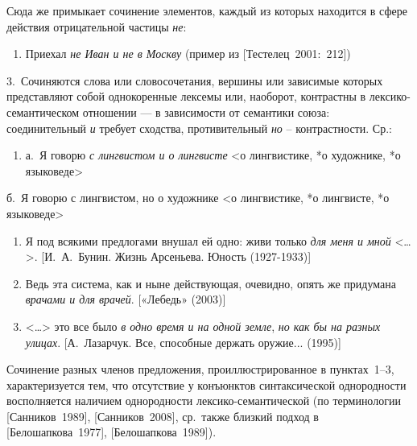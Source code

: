 Сюда же примыкает сочинение элементов, каждый из которых находится в
сфере действия отрицательной частицы \textit{не}:

\begin{enumerate}
  \def\labelenumi{(\arabic{enumi})}
  \setcounter{enumi}{37}
  \item
        Приехал \textit{не Иван и не в Москву} (пример из
        {[}Тестелец~2001:~212{]})
\end{enumerate}

3.~Сочиняются слова или словосочетания, вершины или зависимые которых
представляют собой однокоренные лексемы или, наоборот, контрастны в
лексико-семантическом отношении --- в зависимости от семантики союза:
соединительный \textit{и} требует сходства, противительный \textit{но} --
контрастности. Ср.:

\begin{enumerate}
  \def\labelenumi{(\arabic{enumi})}
  \setcounter{enumi}{38}
  \item
        а.~Я говорю \textit{с лингвистом и о лингвисте} \textless о лингвистике,
        *о художнике, *о языковеде\textgreater{}
\end{enumerate}

б.~Я говорю с лингвистом, но о художнике \textless*о лингвистике, *о
лингвисте, *о языковеде\textgreater{}

\begin{enumerate}
  \def\labelenumi{(\arabic{enumi})}
  \setcounter{enumi}{39}
  \item
        Я под всякими предлогами внушал ей одно: живи только \textit{для меня и
          мной} \textless\ldots\textgreater. {[}И.~А.~Бунин. Жизнь Арсеньева.
        Юность (1927-1933){]}
  \item
        Ведь эта система, как и ныне действующая, очевидно, опять же придумана
        \textit{врачами и для врачей}. {[}«Лебедь» (2003){]}
  \item
        \textless\ldots\textgreater{} это все было \textit{в одно время и на
          одной земле}, \textit{но как бы на разных улицах}. {[}А.~Лазарчук. Все,
        способные держать оружие... (1995){]}
\end{enumerate}

Сочинение разных членов предложения, проиллюстрированное в пунктах~1--3,
характеризуется тем, что отсутствие у конъюнктов синтаксической
однородности восполняется наличием однородности лексико-семантической
(по терминологии {[}Санников~1989{]}, {[}Санников~2008{]}, ср.~также
близкий подход в {[}Белошапкова~1977{]}, {[}Белошапкова~1989{]}).

